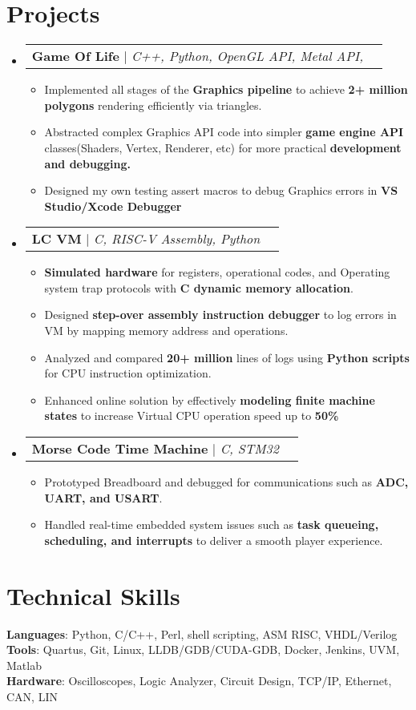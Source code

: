 \documentclass[letterpaper,11pt]{article}
\makeatletter
\newcommand{\resumeItem}[1]{
  \item\small{
    {#1 \vspace{-2pt}}
  }
}
\newcommand{\resumeProjectHeading}[2]{
    \item
    \begin{tabular*}{0.97\textwidth}{l@{\extracolsep{\fill}}r}
      \small#1 & #2 \\
    \end{tabular*}\vspace{-7pt}
}
\newcommand{\resumeSubHeadingListStart}{\begin{itemize}[leftmargin=0.15in, label={}]}
\newcommand{\resumeSubHeadingListEnd}{\end{itemize}}
\newcommand{\resumeItemListStart}{\begin{itemize}}
\newcommand{\resumeItemListEnd}{\end{itemize}\vspace{-5pt}}
\makeatother
\begin{document}
\section{Projects}
    \resumeSubHeadingListStart
      \resumeProjectHeading
      {\textbf{Game Of Life} $|$ \emph{C++, Python, OpenGL API, Metal API, }}{}
          \resumeItemListStart
            \resumeItem {Implemented all stages of the \textbf{Graphics pipeline} to achieve \textbf{2+ million polygons} rendering efficiently via triangles.}
            \resumeItem {Abstracted complex Graphics API code into simpler \textbf{game engine API} classes(Shaders, Vertex, Renderer, etc) for more practical \textbf{development and debugging.}}
            \resumeItem {Designed my own testing assert macros to debug Graphics errors in \textbf{VS Studio/Xcode Debugger}}
          \resumeItemListEnd
      \resumeProjectHeading
      {\textbf{LC VM} $|$ \emph{C, RISC-V Assembly, Python}}{}
      \resumeItemListStart
          \resumeItem {\textbf{Simulated hardware} for registers, operational codes, and Operating system trap protocols with \textbf{C dynamic memory allocation}.}
          \resumeItem  { Designed \textbf{step-over assembly instruction debugger} to log errors in VM by mapping memory address and operations.}
          \resumeItem {Analyzed and compared \textbf{20+ million} lines of logs using \textbf{Python scripts} for CPU instruction optimization.}
          \resumeItem {Enhanced online solution by effectively \textbf{modeling finite machine states} to increase Virtual CPU operation speed up to \textbf{50\%}}
      \resumeItemListEnd
      \resumeProjectHeading
        {\textbf{Morse Code Time Machine} $|$ \emph{C, STM32}}{} 
        \resumeItemListStart
          \resumeItem {Prototyped Breadboard and debugged for communications such as \textbf{ADC, UART, and USART}.}
          \resumeItem {Handled real-time embedded system issues such as \textbf{task queueing, scheduling, and interrupts} to deliver a smooth player experience.}
        \resumeItemListEnd
    \resumeSubHeadingListEnd
%
\section{Technical Skills}
 \begin{itemize}[leftmargin=0.15in, label={}]
    \small{\item{
     \textbf{Languages}{: Python, C/C++, Perl, shell scripting, ASM RISC, VHDL/Verilog} \\
     \textbf{Tools}{: Quartus, Git, Linux, LLDB/GDB/CUDA-GDB, Docker, Jenkins, UVM, Matlab } \\
     \textbf{Hardware}{: Oscilloscopes, Logic Analyzer, Circuit Design, TCP/IP, Ethernet, CAN, LIN } \\
    }}
 \end{itemize}


\end{document}
